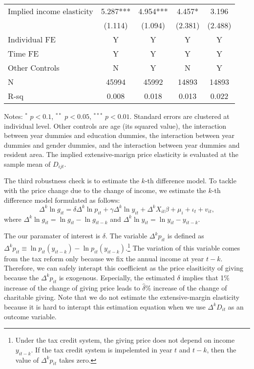 \documentclass[ review  , 3p ]{elsarticle}
\begin{document}
\begin{table}
\begin{threeparttable}
\begin{tabular}[t]{lcccc}
  \hspace{1em}Implied income elasticity & 5.287*** & 4.954*** & 4.457* & 3.196\\
  \hspace{1em} & (1.114) & (1.094) & (2.381) & (2.488)\\
  \hspace{1em}Individual FE & Y & Y & Y & Y\\
  \hspace{1em}Time FE & Y & Y & Y & Y\\
  \hspace{1em}Other Controls & N & Y & N & Y\\
  \hspace{1em}N & 45994 & 45992 & 14893 & 14893\\
  \hspace{1em}R-sq & 0.008 & 0.018 & 0.013 & 0.022\\
  \bottomrule
  \end{tabular}
  \begin{tablenotes}
  \item Notes: $^{*}$ $p < 0.1$, $^{**}$ $p < 0.05$, $^{***}$ $p < 0.01$. Standard errors are clustered at individual level. Other controls are age (its squared value), the interaction between year dummies and education dummies, the interaction between year dummies and gender dummies, and the interaction between year dummies and resident area. The implied extensive-marign price elasticity is evaluated at the sample mean of $D_{ijt}$.
  \end{tablenotes}
  \end{threeparttable}
  \end{table}

  The third robustness check is to estimate the \(k\)-th difference model.
  To tackle with the price change due to the change of income,
  we estimate the \(k\)-th difference model formulated as follows:
  \[\Delta^k \ln g_{it} = \delta \Delta^k \ln p_{it} + \gamma \Delta^k \ln y_{it} + \Delta^k X_{it} \beta + \mu_i + \iota_t + v_{it},\]
  where \(\Delta^k \ln g_{it} = \ln g_{it} - \ln g_{it-k}\) and \(\Delta^k \ln y_{it} = \ln y_{it} - y_{it-k}\).

  \color{blue}

  The our paramater of interest is \(\delta\).
  The variable \(\Delta^k p_{it}\) is defined as \(\Delta^k p_{it} \equiv \ln p_{it}(y_{it-k}) - \ln p_{it}(y_{it-k})\).\footnote{Under the tax credit system, the giving price does not depend on income \(y_{it-k}\). If the tax credit system is impelemted in year \(t\) and \(t-k\), then the value of \(\Delta^k p_{it}\) takes zero.}
  The variation of this variable comes from the tax reform only because we fix the annual income at year \(t - k\).
  Therefore, we can safely interapt this coefficient as the price elasiticity of giving
  because the \(\Delta^k p_{it}\) is exogenous.
  Especially, the estimated \(\delta\) implies that
  1\% increase of the change of giving price leads to \(\hat{\delta}\)\% increase of the change of charitable giving.
  Note that we do not estimate the extensive-margin elasticity
  because it is hard to interapt this estimation equation when we use \(\Delta^k D_{it}\) as an outcome variable.
\end{document}
